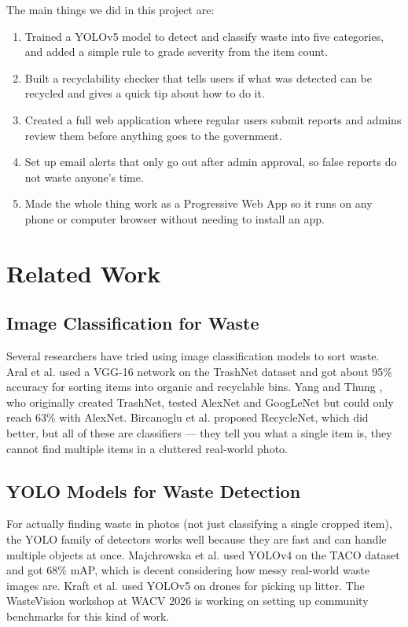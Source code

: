 \documentclass[conference]{IEEEtran}
\begin{document}
The main things we did in this project are:

\begin{enumerate}[leftmargin=*]
    \item Trained a YOLOv5 model to detect and classify waste into five categories, and added a simple rule to grade severity from the item count.
    \item Built a recyclability checker that tells users if what was detected can be recycled and gives a quick tip about how to do it.
    \item Created a full web application where regular users submit reports and admins review them before anything goes to the government.
    \item Set up email alerts that only go out after admin approval, so false reports do not waste anyone's time.
    \item Made the whole thing work as a Progressive Web App so it runs on any phone or computer browser without needing to install an app.
\end{enumerate}

\section{Related Work}

\subsection{Image Classification for Waste}
Several researchers have tried using image classification models to sort waste. Aral et al. \cite{aral2018classification} used a VGG-16 network on the TrashNet dataset and got about 95\% accuracy for sorting items into organic and recyclable bins. Yang and Thung \cite{yang2017classification}, who originally created TrashNet, tested AlexNet and GoogLeNet but could only reach 63\% with AlexNet. Bircanoglu et al. \cite{bircanoğlu2018recyclenet} proposed RecycleNet, which did better, but all of these are classifiers — they tell you what a single item is, they cannot find multiple items in a cluttered real-world photo.

\subsection{YOLO Models for Waste Detection}
For actually finding waste in photos (not just classifying a single cropped item), the YOLO family of detectors works well because they are fast and can handle multiple objects at once. Majchrowska et al. \cite{majchrowska2022deep} used YOLOv4 on the TACO dataset \cite{proenca2020taco} and got 68\% mAP, which is decent considering how messy real-world waste images are. Kraft et al. \cite{kraft2021autonomous} used YOLOv5 on drones for picking up litter. The WasteVision workshop at WACV 2026 \cite{wastevision2026} is working on setting up community benchmarks for this kind of work.
\end{document}
